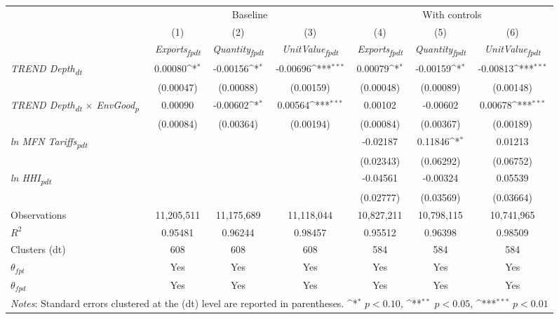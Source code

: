 {
\def\sym#1{\ifmmode^{#1}\else\(^{#1}\)\fi}
\begin{tabular}{l*{6}{c}}
\toprule
&\multicolumn{3}{c}{Baseline}&\multicolumn{3}{c}{With controls}\\\cmidrule(lr){2-4}\cmidrule(lr){5-7}
&(1)&(2)&(3)&(4)&(5)&(6)\\
&\textit{Exports\textsubscript{fpdt}}&\textit{Quantity\textsubscript{fpdt}}&\textit{UnitValue\textsubscript{fpdt}}&\textit{Exports\textsubscript{fpdt}}&\textit{Quantity\textsubscript{fpdt}}&\textit{UnitValue\textsubscript{fpdt}}\\
\midrule
\textit{TREND Depth\textsubscript{dt}} & 0.00080\sym{*} & -0.00156\sym{*} & -0.00696\sym{***} & 0.00079\sym{*} & -0.00159\sym{*} & -0.00813\sym{***}\\
 & (0.00047) & (0.00088) & (0.00159) & (0.00048) & (0.00089) & (0.00148)\\
\addlinespace
\textit{TREND Depth\textsubscript{dt} $\times$ EnvGood\textsubscript{p}} & 0.00090 & -0.00602\sym{*} & 0.00564\sym{***} & 0.00102 & -0.00602 & 0.00678\sym{***}\\
 & (0.00084) & (0.00364) & (0.00194) & (0.00084) & (0.00367) & (0.00189)\\
\addlinespace
\textit{ln MFN Tariffs\textsubscript{pdt}} &  &  &  & -0.02187 & 0.11846\sym{*} & 0.01213\\
 &  &  &  & (0.02343) & (0.06292) & (0.06752)\\
\addlinespace
\textit{ln HHI\textsubscript{pdt}} &  &  &  & -0.04561 & -0.00324 & 0.05539\\
 &  &  &  & (0.02777) & (0.03569) & (0.03664)\\
\midrule
Observations & 11,205,511 & 11,175,689 & 11,118,044 & 10,827,211 & 10,798,115 & 10,741,965\\
$R^{2}$ & 0.95481 & 0.96244 & 0.98457 & 0.95512 & 0.96398 & 0.98509\\
Clusters (dt) & 608 & 608 & 608 & 584 & 584 & 584\\
$\theta_{fpt}$ & Yes & Yes & Yes & Yes & Yes & Yes\\
$\theta_{fpd}$ & Yes & Yes & Yes & Yes & Yes & Yes\\
\bottomrule
\multicolumn{7}{l}{\footnotesize \textit{Notes}: Standard errors clustered at the (dt) level are reported in parentheses. \sym{*} \(p<0.10\), \sym{**} \(p<0.05\), \sym{***} \(p<0.01\)}\\
\end{tabular}
}
